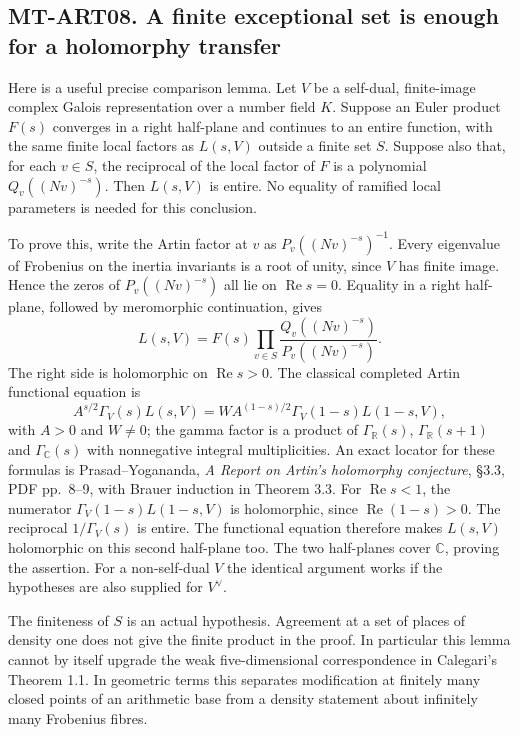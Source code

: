 \subsection*{MT-ART08. A finite exceptional set is enough for a holomorphy transfer}
Here is a useful precise comparison lemma. Let $V$ be a self-dual,
finite-image complex Galois representation over a number field $K$.
Suppose an Euler product $F(s)$ converges in a right half-plane and
continues to an entire function, with the same finite local factors as $L(s,V)$ outside a
finite set $S$. Suppose also that, for each $v\in S$, the reciprocal of
the local factor of $F$ is a polynomial $Q_v((Nv)^{-s})$.
Then $L(s,V)$ is entire. No equality of ramified local parameters is
needed for this conclusion.

To prove this, write the Artin factor at $v$ as
$P_v((Nv)^{-s})^{-1}$. Every eigenvalue of Frobenius on the inertia
invariants is a root of unity, since $V$ has finite image. Hence the zeros
of $P_v((Nv)^{-s})$ all lie on $\operatorname{Re}s=0$.
Equality in a right half-plane, followed by meromorphic continuation,
gives
\[
 L(s,V)=F(s)\prod_{v\in S}
             \frac{Q_v((Nv)^{-s})}{P_v((Nv)^{-s})}.
\]
The right side is holomorphic on $\operatorname{Re}s>0$.
The classical completed Artin functional equation is
\[
 A^{s/2}\Gamma_V(s)L(s,V)
   =W A^{(1-s)/2}\Gamma_V(1-s)L(1-s,V),
\]
with $A>0$ and $W\ne0$; the gamma factor is a product of
$\Gamma_{\mathbb R}(s)$, $\Gamma_{\mathbb R}(s+1)$ and
$\Gamma_{\mathbb C}(s)$ with nonnegative integral multiplicities.
An exact locator for these formulas is Prasad--Yogananda,
\emph{A Report on Artin's holomorphy conjecture}, \S3.3,
PDF pp.~8--9, with Brauer induction in Theorem 3.3.
For $\operatorname{Re}s<1$, the numerator
$\Gamma_V(1-s)L(1-s,V)$ is holomorphic, since
$\operatorname{Re}(1-s)>0$. The reciprocal $1/\Gamma_V(s)$ is entire.
The functional equation therefore makes $L(s,V)$ holomorphic on this
second half-plane too. The two half-planes cover $\mathbb C$, proving
the assertion. For a non-self-dual $V$ the identical argument works if
the hypotheses are also supplied for $V^\vee$.

The finiteness of $S$ is an actual hypothesis. Agreement at a set of
places of density one does not give the finite product in the proof.
In particular this lemma cannot by itself upgrade the weak
five-dimensional correspondence in Calegari's Theorem 1.1.
In geometric terms this separates modification at finitely many closed
points of an arithmetic base from a density statement about infinitely
many Frobenius fibres.

